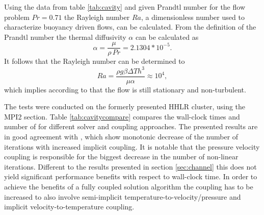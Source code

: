 Using the data from table \ref{tab:cavity} and given Prandtl number for the flow problem \(Pr = 0.71\) the Rayleigh number \(Ra\), a dimensionless number used to characterize buoyancy driven flows, can be calculated. From the definition of the Prandtl number the thermal diffusivity \(\alpha\) can be calculated as
\begin{displaymath}
  \alpha = \frac{\mu}{\rho \, Pr} = 2.1304 * 10^{-5}.
\end{displaymath}
It follows that the Rayleigh number can be determined to 
\begin{displaymath}
  Ra = \frac{\rho g \beta \Delta T h^3}{\mu \alpha} \approx 10^4,
\end{displaymath}
which implies according to \cite{christon02} that the flow is still stationary and non-turbulent.

The tests were conducted on the formerly presented HHLR cluster, using the MPI2 section. Table \ref{tab:cavitycompare} compares the wall-clock times and number of  for different solver and coupling approaches. The presented results are in good agreement with \cite{vakilipour12}, which show monotonic decrease of the number of iterations with increased implicit coupling. It is notable that the pressure velocity coupling is responsible for the biggest decrease in the number of non-linear iterations. Different to the results presented in section \ref{sec:channel} this does not yield significant performance benefits with respect to wall-clock time.  In order to achieve the benefits of a fully coupled solution algorithm the coupling has to be increased to also involve semi-implicit temperature-to-velocity/pressure and implicit velocity-to-temperature coupling. 

